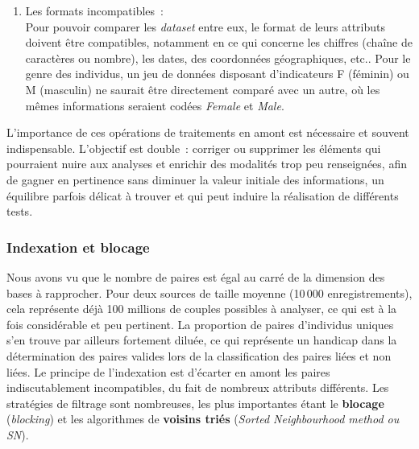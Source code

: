 \documentclass[a4paper,12pt,twoside]{book}
\begin{document}
\begin{enumerate}
			        Cependant, extraire les composantes, du nom d'un individu par exemple, peut nécessiter des règles codées complexes. Dans de nombreux cas de figures, ce processus implique la création et la maintenance de nombreuses tables de conversion. Pour palier à ces limites mais également obtenir une plus grande souplesse, des approches statistiques ce sont développées, notamment le modèle de Markov\footnote{Ou chaîne de Markow~: calcul de probabilité de phénomènes aléatoires basé sur le principe d'une interdépendance d'évènements liés les uns aux autres tels les maillons d’une chaîne, utilisé en reconnaissance vocable, l'analyse de séquences biologiques, le traitement automatique du langage naturel, etc.} (\textit{Hidden Markov Model}).

			        \item Les formats incompatibles~:\\
			        \label{format}
			        Pour pouvoir comparer les \textit{dataset} entre eux, le format de leurs attributs doivent être compatibles, notamment en ce qui concerne les chiffres (chaîne de caractères ou nombre), les dates, des coordonnées géographiques, etc..
			        Pour le genre des individus, un jeu de données disposant d'indicateurs F (féminin) ou M (masculin) ne saurait être directement comparé avec un autre, où les mêmes informations seraient codées \og{}\textit{Female}\fg{} et \og{}\textit{Male}\fg{}.
			    \end{enumerate}

			    L'importance de ces opérations de traitements en amont est nécessaire et souvent indispensable. L'objectif est double~: corriger ou supprimer les éléments qui pourraient nuire aux analyses et enrichir des modalités trop peu renseignées, afin de gagner en pertinence sans diminuer la valeur initiale des informations, un équilibre parfois délicat à trouver et qui peut induire la réalisation de différents tests.

			    \subsubsection{Indexation et blocage}
			    \label{bloc}
			    Nous avons vu que le nombre de paires est égal au carré de la dimension des bases à rapprocher. Pour deux sources de taille moyenne (10\,000 enregistrements), cela représente déjà 100 millions de couples possibles à analyser, ce qui est à la fois considérable et peu pertinent.
			    La proportion de paires d'individus uniques s'en trouve par ailleurs fortement diluée, ce qui représente un handicap dans la détermination des paires valides lors de la classification des paires liées et non liées.
			    Le principe de l'indexation est d'écarter en amont les paires indiscutablement incompatibles, du fait de nombreux attributs différents. Les stratégies de filtrage sont nombreuses, les plus importantes étant le \textbf{blocage} (\textit{blocking}) et les algorithmes de \og{}\textbf{voisins triés}\fg{} (\textit{Sorted Neighbourhood method ou SN}).
			    
\end{document}

